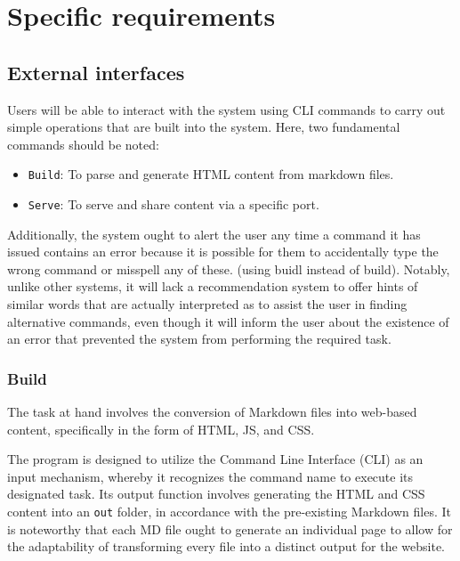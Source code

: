 
\section{Specific requirements}\label{sec:specific-requirements}

\subsection{External interfaces}\label{subsec:external-interfaces}

Users will be able to interact with the system using CLI commands\cite{wikicli} to
carry out simple operations that are built into the system. Here, two
fundamental commands should be noted:

\begin{itemize}
    \item
    \texttt{Build}: To parse and generate HTML content from markdown files.
    \item
    \texttt{Serve}: To serve and share content via a specific port.
\end{itemize}

Additionally, the system ought to alert the user any time a command it
has issued contains an error because it is possible for them to
accidentally type the wrong command or misspell any of these. (using
buidl instead of build). Notably, unlike other systems, it will lack a
recommendation system to offer hints of similar words that are actually
interpreted as to assist the user in finding alternative commands, even
though it will inform the user about the existence of an error that
prevented the system from performing the required task.

\subsubsection{Build}\label{subsubsec:build}

The task at hand involves the conversion of Markdown files\cite{wikimd} into
web-based content, specifically in the form of HTML\cite{htmlmoz}, JS\cite{jsmoz}, and CSS\cite{cssmoz}.

The program is designed to utilize the Command Line Interface (CLI) as
an input mechanism, whereby it recognizes the command name to execute
its designated task. Its output function involves generating the HTML
and CSS content into an \texttt{out} folder, in accordance with the
pre-existing Markdown files. It is noteworthy that each MD file ought to
generate an individual page to allow for the adaptability of
transforming every file into a distinct output for the website.

